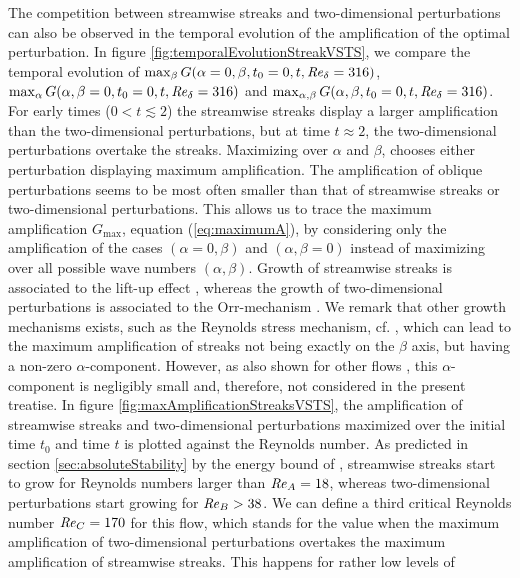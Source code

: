 \documentclass{jfm}
\newcommand\Rey{\mbox{\textit{Re}}}  %
\begin{document}
The competition between streamwise streaks
and two-dimensional perturbations can also be observed in the 
temporal evolution of the amplification of the optimal perturbation. 
In figure \ref{fig:temporalEvolutionStreakVSTS}, we
compare the temporal evolution
of $ \max_\beta G(\alpha=0,\beta,t_0 = 0 , t , \Rey_\delta = 316) $,
 $ \max_\alpha G(\alpha,\beta=0,t_0 = 0 , t , \Rey_\delta = 316) $
and  $ \max_{\alpha,\beta} G(\alpha,\beta,t_0 = 0 , t , \Rey_\delta = 316) $. 
For early times ($ 0 < t \lesssim 2 $) 
the streamwise streaks display a larger amplification
than the two-dimensional perturbations, but at time $ t \approx 2 $, 
the two-dimensional perturbations overtake the streaks. Maximizing over $ \alpha $ and $ \beta $,
chooses either perturbation displaying maximum amplification. 
The amplification of oblique perturbations seems
to be most often smaller than that of streamwise streaks or two-dimensional
perturbations. This allows us to trace the maximum amplification $ G_{\max} $,
equation (\ref{eq:maximumA}), by considering
only the amplification of the cases $ (\alpha = 0,\beta) $ and
 $ (\alpha,\beta = 0) $ 
instead of maximizing over all possible wave numbers $ (\alpha,\beta)$. 
Growth of streamwise streaks is associated to
the lift-up effect \citep{EllingsenPalm1975}, whereas the growth of
two-dimensional perturbations is associated to the Orr-mechanism
\citep{Jimenez2013}. We remark that
other growth mechanisms exists, such as the Reynolds stress mechanism,
cf. \citet{ButlerFarrell1992}, which can lead to the maximum amplification
of streaks not being exactly on the $ \beta $ axis, 
but having a non-zero $ \alpha $-component. However, as also shown for
other flows \citep{ButlerFarrell1992}, this $ \alpha $-component 
is negligibly small and, therefore, not considered in the present
treatise. 
In figure \ref{fig:maxAmplificationStreaksVSTS}, the amplification
of streamwise streaks and two-dimensional perturbations maximized over
the initial time $ t_0 $ and time $ t $ is plotted against the Reynolds number.
As predicted in section \ref{sec:absoluteStability}
by the energy bound of \citet{DavisKerczek1973}, streamwise streaks start
to grow for Reynolds numbers larger than $ \Rey_A = 18 $,
whereas two-dimensional perturbations start growing
for $ \Rey_B > 38 $. We can define a third critical Reynolds number
$ \Rey_C = 170 $ for this flow, which stands for
the value when the maximum amplification
of two-dimensional perturbations overtakes the maximum amplification
of streamwise streaks. This happens for rather low levels of
\end{document}
